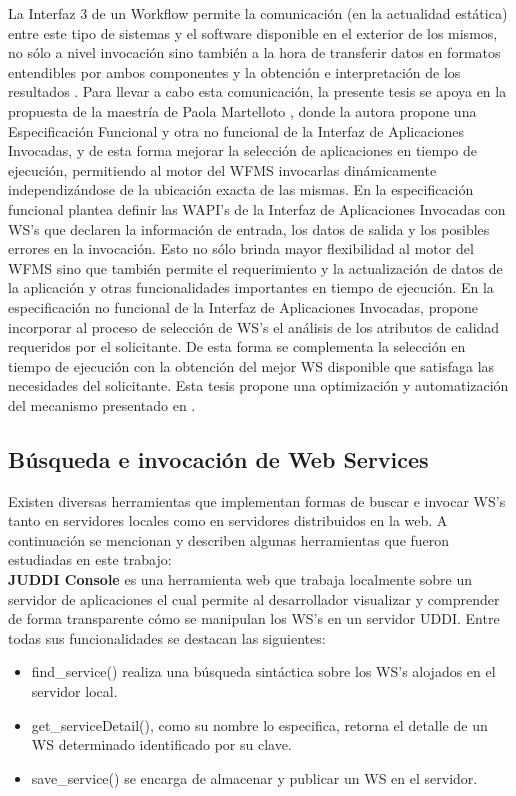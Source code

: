 La Interfaz 3 de un Workflow permite la comunicación (en la actualidad estática) entre este tipo de sistemas y el software disponible en el exterior de los mismos, no sólo a nivel invocación sino también a la hora de transferir datos en formatos entendibles por ambos componentes y la obtención e interpretación de los resultados \cite{WfMCb}. Para llevar a cabo esta comunicación, la presente tesis se apoya en la propuesta de la maestría de Paola Martelloto \cite{1}, donde la autora propone una Especificación Funcional y otra no funcional de la Interfaz de Aplicaciones Invocadas, y de esta forma mejorar la selección de aplicaciones en tiempo de ejecución, permitiendo al motor del WFMS invocarlas dinámicamente independizándose de la ubicación exacta de las mismas. En la especificación funcional plantea definir las WAPI's de la Interfaz de Aplicaciones Invocadas con WS's que declaren la información de entrada, los datos de salida y los posibles errores en la invocación. Esto no sólo brinda mayor flexibilidad al motor del WFMS sino que también permite el requerimiento y la actualización de datos de la aplicación y otras funcionalidades importantes en tiempo de ejecución. En la especificación no funcional de la Interfaz de Aplicaciones Invocadas, propone incorporar al proceso de selección de WS's el análisis de los atributos de calidad requeridos por el solicitante. De esta forma se complementa la selección en tiempo de ejecución con la obtención del mejor WS disponible que satisfaga las necesidades del solicitante. Esta tesis propone una optimización y automatización del mecanismo presentado en \cite{1}.

\subsection{Búsqueda e invocación de Web Services}
\label{Búsqueda e invocación de Web Services}

Existen diversas herramientas que implementan formas de buscar e invocar WS's tanto en servidores locales como en servidores distribuidos en la web. A continuación se mencionan y describen algunas herramientas que fueron estudiadas en este trabajo:\\

\textbf{JUDDI Console} \cite{JUDDI-Console} es una herramienta web que trabaja localmente sobre un servidor de aplicaciones el cual permite al desarrollador visualizar y comprender de forma transparente cómo se manipulan los WS's en un servidor UDDI. Entre todas sus funcionalidades se destacan las siguientes:
	\begin{itemize}
		\item find\_service()  realiza una búsqueda sintáctica sobre los WS's alojados en el servidor local. 
		
		\item get\_serviceDetail(), como su nombre lo especifica, retorna el detalle de un WS determinado identificado por su clave. 
						
		\item save\_service()  se encarga de almacenar y publicar un WS en el servidor.
		
	\end{itemize}
	
